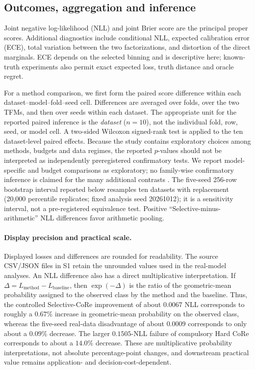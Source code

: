 \documentclass[a4paper,fleqn]{cas-sc}
\begin{document}
\subsection{Outcomes, aggregation and inference}
Joint negative log-likelihood (NLL) and joint Brier score are the principal proper scores. Additional diagnostics include conditional NLL, expected calibration error (ECE), total variation between the two factorizations, and distortion of the direct marginals. ECE depends on the selected binning and is descriptive here; known-truth experiments also permit exact expected loss, truth distance and oracle regret.

For a method comparison, we first form the paired score difference within each dataset--model--fold--seed cell. Differences are averaged over folds, over the two TFMs, and then over seeds within each dataset. The appropriate unit for the reported paired inference is the \emph{dataset} ($n=10$), not the individual fold, row, seed, or model cell. A two-sided Wilcoxon signed-rank test is applied to the ten dataset-level paired effects. Because the study contains exploratory choices among methods, budgets and data regimes, the reported $p$-values should not be interpreted as independently preregistered confirmatory tests. We report model-specific and budget comparisons as exploratory; no family-wise confirmatory inference is claimed for the many additional contrasts \citep{demsar2006comparisons}. The five-seed 256-row bootstrap interval reported below resamples ten datasets with replacement (20,000 percentile replicates; fixed analysis seed 20261012); it is a sensitivity interval, not a pre-registered equivalence test. Positive ``Selective-minus-arithmetic'' NLL differences favor arithmetic pooling.

\paragraph{Display precision and practical scale.} Displayed losses and differences are rounded for readability. The source CSV/JSON files in S1 retain the unrounded values used in the real-model analyses. An NLL difference also has a direct multiplicative interpretation. If $\Delta=L_{\mathrm{method}}-L_{\mathrm{baseline}}$, then $\exp(-\Delta)$ is the ratio of the geometric-mean probability assigned to the observed class by the method and the baseline. Thus, the controlled Selective-CoRe improvement of about $0.0067$ NLL corresponds to roughly a $0.67\%$ increase in geometric-mean probability on the observed class, whereas the five-seed real-data disadvantage of about $0.0009$ corresponds to only about a $0.09\%$ decrease. The larger $0.1505$-NLL failure of compulsory Hard CoRe corresponds to about a $14.0\%$ decrease. These are multiplicative probability interpretations, not absolute percentage-point changes, and downstream practical value remains application- and decision-cost-dependent.
\end{document}
